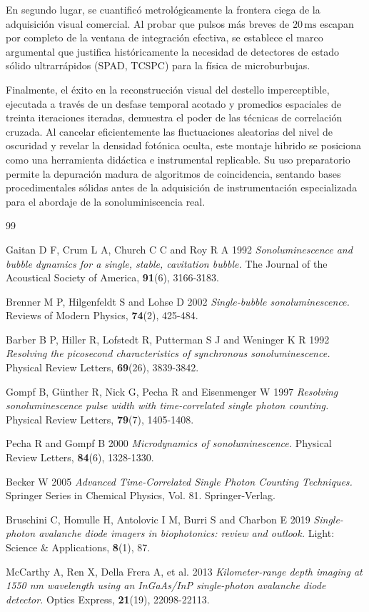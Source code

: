 \documentclass[10pt,a4paper,twocolumn]{article}
\begin{document}
En segundo lugar, se cuantificó metrológicamente la frontera ciega de la adquisición visual comercial. Al probar que pulsos más breves de \(20\,\mathrm{ms}\) escapan por completo de la ventana de integración efectiva, se establece el marco argumental que justifica históricamente la necesidad de detectores de estado sólido ultrarrápidos (SPAD, TCSPC) para la física de microburbujas.

Finalmente, el éxito en la reconstrucción visual del destello imperceptible, ejecutada a través de un desfase temporal acotado y promedios espaciales de treinta iteraciones iteradas, demuestra el poder de las técnicas de correlación cruzada. Al cancelar eficientemente las fluctuaciones aleatorias del nivel de oscuridad y revelar la densidad fotónica oculta, este montaje hibrido se posiciona como una herramienta didáctica e instrumental replicable. Su uso preparatorio permite la depuración madura de algoritmos de coincidencia, sentando bases procedimentales sólidas antes de la adquisición de instrumentación especializada para el abordaje de la sonoluminiscencia real.

\renewcommand{\refname}{Referencias}
\begin{thebibliography}{99}

Gaitan D F, Crum L A, Church C C and Roy R A 1992
\textit{Sonoluminescence and bubble dynamics for a single, stable, cavitation bubble.} The Journal of the Acoustical Society of America, \textbf{91}(6), 3166-3183.

Brenner M P, Hilgenfeldt S and Lohse D 2002
\textit{Single-bubble sonoluminescence.} Reviews of Modern Physics, \textbf{74}(2), 425-484.

Barber B P, Hiller R, Lofstedt R, Putterman S J and Weninger K R 1992
\textit{Resolving the picosecond characteristics of synchronous sonoluminescence.} Physical Review Letters, \textbf{69}(26), 3839-3842.

Gompf B, Günther R, Nick G, Pecha R and Eisenmenger W 1997
\textit{Resolving sonoluminescence pulse width with time-correlated single photon counting.} Physical Review Letters, \textbf{79}(7), 1405-1408.

Pecha R and Gompf B 2000
\textit{Microdynamics of sonoluminescence.} Physical Review Letters, \textbf{84}(6), 1328-1330.

Becker W 2005
\textit{Advanced Time-Correlated Single Photon Counting Techniques.} Springer Series in Chemical Physics, Vol. 81. Springer-Verlag.

Bruschini C, Homulle H, Antolovic I M, Burri S and Charbon E 2019
\textit{Single-photon avalanche diode imagers in biophotonics: review and outlook.} Light: Science \& Applications, \textbf{8}(1), 87.

McCarthy A, Ren X, Della Frera A, et al. 2013
\textit{Kilometer-range depth imaging at 1550 nm wavelength using an InGaAs/InP single-photon avalanche diode detector.} Optics Express, \textbf{21}(19), 22098-22113.

\end{thebibliography}
\end{document}
